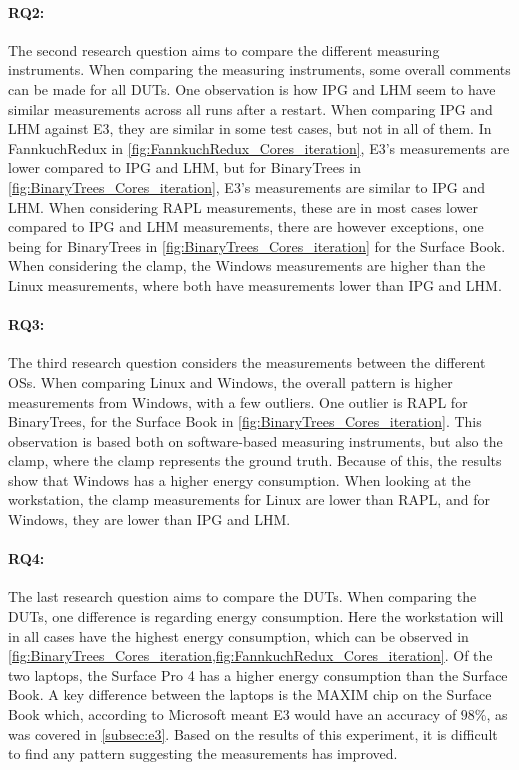 \paragraph*{RQ2:} The second research question aims to compare the different measuring instruments. When comparing the measuring instruments, some overall comments can be made for all DUTs. One observation is how IPG and LHM seem to have similar measurements across all runs after a restart. When comparing IPG and LHM against E3, they are similar in some test cases, but not in all of them. In FannkuchRedux in \cref{fig:FannkuchRedux_Cores_iteration}, E3's measurements are lower compared to IPG and LHM, but for BinaryTrees in \cref{fig:BinaryTrees_Cores_iteration}, E3's measurements are similar to IPG and LHM. When considering RAPL measurements, these are in most cases lower compared to IPG and LHM measurements, there are however exceptions, one being for BinaryTrees in \cref{fig:BinaryTrees_Cores_iteration} for the Surface Book. When considering the clamp, the Windows measurements are higher than the Linux measurements, where both have measurements lower than IPG and LHM. 



\paragraph*{RQ3:} The third research question considers the measurements between the different OSs. When comparing Linux and Windows, the overall pattern is higher measurements from Windows, with a few outliers. One outlier is RAPL for BinaryTrees, for the Surface Book in \cref{fig:BinaryTrees_Cores_iteration}. This observation is based both on software-based measuring instruments, but also the clamp, where the clamp represents the ground truth. Because of this, the results show that Windows has a higher energy consumption. When looking at the workstation, the clamp measurements for Linux are lower than RAPL, and for Windows, they are lower than IPG and LHM.

\paragraph*{RQ4:} The last research question aims to compare the DUTs. When comparing the DUTs, one difference is regarding energy consumption. Here the workstation will in all cases have the highest energy consumption, which can be observed in \cref{fig:BinaryTrees_Cores_iteration,fig:FannkuchRedux_Cores_iteration}. Of the two laptops, the Surface Pro 4 has a higher energy consumption than the Surface Book. A key difference between the laptops is the MAXIM chip on the Surface Book which, according to Microsoft meant E3 would have an accuracy of $98\%$\cite{E3WinHec}, as was covered in \cref{subsec:e3}. Based on the results of this experiment, it is difficult to find any pattern suggesting the measurements has improved.
